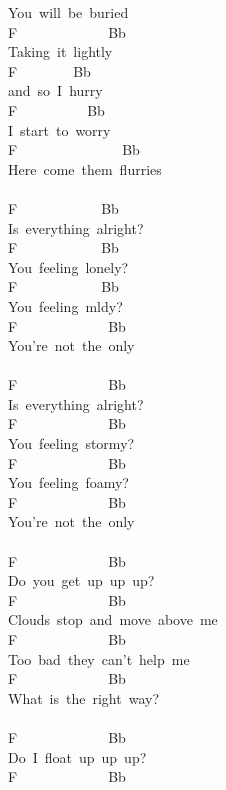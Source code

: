 {You\ will\ be\ buried\\
F\ \ \ \ \ \ \ \ \ \ \ \ \ Bb\\
Taking\ it\ lightly\\
F\ \ \ \ \ \ \ \ Bb\\
and\ so\ I\ hurry\\
F\ \ \ \ \ \ \ \ \ \ Bb\\
I\ start\ to\ worry\\
F\ \ \ \ \ \ \ \ \ \ \ \ \ \ \ Bb\\
Here\ come\ them\ flurries\\
\\
F\ \ \ \ \ \ \ \ \ \ \ \ Bb\\
Is\ everything\ alright?\\
F\ \ \ \ \ \ \ \ \ \ \ \ Bb\\
You\ feeling\ lonely?\\
F\ \ \ \ \ \ \ \ \ \ \ \ Bb\\
You\ feeling\ mldy?\\
F\ \ \ \ \ \ \ \ \ \ \ \ \ Bb\\
You're\ not\ the\ only\\
\\
F\ \ \ \ \ \ \ \ \ \ \ \ \ Bb\\
Is\ everything\ alright?\\
F\ \ \ \ \ \ \ \ \ \ \ \ \ Bb\\
You\ feeling\ stormy?\\
F\ \ \ \ \ \ \ \ \ \ \ \ \ Bb\\
You\ feeling\ foamy?\\
F\ \ \ \ \ \ \ \ \ \ \ \ \ Bb\\
You're\ not\ the\ only\\
\\
F\ \ \ \ \ \ \ \ \ \ \ \ \ Bb\\
Do\ you\ get\ up\ up\ up?\\
F\ \ \ \ \ \ \ \ \ \ \ \ \ Bb\\
Clouds\ stop\ and\ move\ above\ me\\
F\ \ \ \ \ \ \ \ \ \ \ \ \ Bb\\
Too\ bad\ they\ can't\ help\ me\\
F\ \ \ \ \ \ \ \ \ \ \ \ \ Bb\\
What\ is\ the\ right\ way?\\
\\
F\ \ \ \ \ \ \ \ \ \ \ \ \ Bb\\
Do\ I\ float\ up\ up\ up?\\
F\ \ \ \ \ \ \ \ \ \ \ \ \ Bb\\
}

